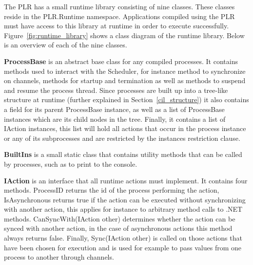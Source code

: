 	The PLR has a small runtime library consisting of nine classes. These classes
	reside in the \textsf{PLR.Runtime} namespace. Applications compiled using 
	the PLR must have access to this library at runtime in order to execute 
	successfully. Figure~\ref{fig:runtime_library} shows a class diagram of the 
	runtime library. Below is an overview of each of the nine classes.

	\textbf{ProcessBase} is an abstract base class for any compiled processes.
	It contains methods used to interact with the \textsf{Scheduler},
	for instance method to synchronize on channels, methods for startup and
	termination as well as methods to suspend and resume the process thread.
	Since processes are built up into a tree-like structure at runtime (further 
	explained in Section~\ref{cil_structure}) it also contains a field for its 
	parent \textsf{ProcessBase} instance, as well as a list of 
	\textsf{ProcessBase} instances which are its child nodes in the tree. 
	Finally, it contains a list of \textsf{IAction} instances, this list will 
	hold all actions that occur in the process instance or any of its 
	subprocesses and are restricted by the instances restriction clause.
	
	\textbf{BuiltIns} is a small static class that contains utility methods
	that can be called by processes, such as to print to the console.
	
	\textbf{IAction} is an interface that all runtime actions must implement.
	It contains four methods. \textsf{ProcessID} returns the id of the
	process performing the action, \textsf{IsAsynchronous} returns true if
	the action can be executed without synchronizing with another action, 
	this applies for instance to arbitrary method calls to .NET methods.
	\textsf{CanSyncWith(IAction other)} determines whether the action can be 
	synced with another action, in the case of asynchronous actions this
	method always returns false. Finally, \textsf{Sync(IAction other)} is 
	called on those actions that have been chosen for execution and is used
	for example to pass values from one process to another through channels.

